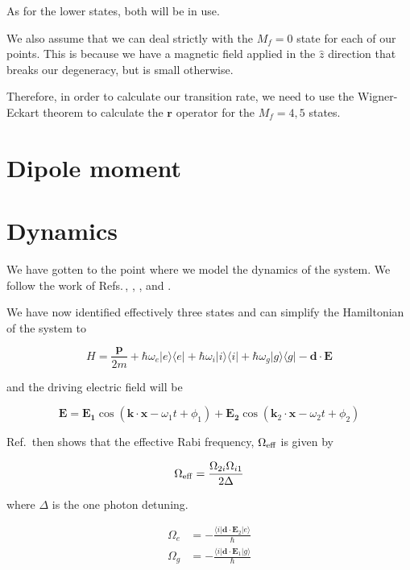 As for the lower states, both will be in use.

We also assume that we can deal strictly with the $M_f=0$ state for each of our points. This is because we have a magnetic field applied in the $\hat{z}$ direction that breaks our degeneracy, but is small otherwise.

Therefore, in order to calculate our transition rate, we need to use the Wigner-Eckart theorem to calculate the $\mathbf{r}$ operator for the $M_f=4,5$ states.

\section{Dipole moment}


\section{Dynamics}

We have gotten to the point where we model the dynamics of the system. We follow the work of Refs.\,\cite{Young1997363}, \cite{gustavsonThesis}, \cite{footAtomicPhysics}, \cite{cjeDiss} and \cite{RamanBeamSplit}.

We have now identified effectively three states and can simplify the Hamiltonian of the system to 

\begin{equation}
H=\frac{\mathbf{p}}{2m} + 
\hbar\omega_e |e\rangle\langle e | +
\hbar\omega_i |i\rangle\langle i | +
\hbar\omega_g |g\rangle\langle g | -
\mathbf{d}\cdot\mathbf{E}
\end{equation}

and the driving electric field will be

\begin{equation}
\mathbf{E}=\mathbf{E_1} \cos(\mathbf{k}\cdot\mathbf{x} - \omega_1 t + \phi_1)
+\mathbf{E_2} \cos(\mathbf{k}_2\cdot\mathbf{x} - \omega_2 t + \phi_2)
\end{equation}

Ref.\,\cite{Young1997363} then shows that the effective Rabi frequency, $\Omega_{\textnormal{eff}}$ is given by 

\begin{equation}
\Omega_{\rm eff}=\frac{\Omega_{2i} \Omega_{i1}}{2 \Delta}
\end{equation}

where $\Delta$ is the one photon detuning. %

\begin{align}
\Omega_e&=-\frac{\langle i | \mathbf{d}\cdot \mathbf{E}_2 | e\rangle }{\hbar}\\
\Omega_g&=-\frac{\langle i | \mathbf{d}\cdot \mathbf{E}_1 | g\rangle}{\hbar}
\end{align}

